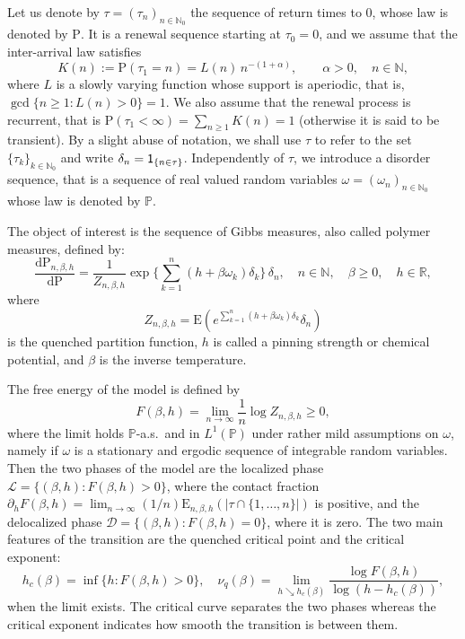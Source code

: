 \documentclass[10pt]{amsart}
\theoremstyle{definition}\newtheorem{defi}[theo]{Definition}\newtheorem{rema}[theo]{Remark}\newtheorem{exam}[theo]{Example}\newtheorem{exem}[theo]{Example}\newtheorem{nota}[theo]{Notation}
\newcommand{\bbN}{{\ensuremath{\mathbb N}}}
\newcommand{\bbP}{{\ensuremath{\mathbb P}}}
\newcommand{\bbR}{{\ensuremath{\mathbb R}}}
\newcommand{\cD}{{\ensuremath{\mathcal D}}}
\newcommand{\cL}{{\ensuremath{\mathcal L}}}
\newcommand{\ga}{\alpha}
\newcommand{\gb}{\beta}
\newcommand{\gd}{\delta}
\newcommand{\go}{\omega}
\newcommand{\dd}{\mathrm{d}}
\newcommand\bP{\ensuremath{\mathrm{P}}}
\newcommand\bE{\ensuremath{\mathrm{E}}}
\newcommand{\ind}{{\sf 1}}
\begin{document}
Let us denote by $\tau = (\tau_n)_{n\in\bbN_0}$ the sequence of return times to $0$, whose law is denoted by $\bP$. It is a renewal sequence starting at $\tau_0 = 0$, and we assume that the inter-arrival law satisfies
\begin{equation}\label{eq:defK_regvar}
K(n) := \bP(\tau_1 = n) = L(n) \, n^{- (1 + \ga)},\qquad \ga > 0,\quad n\in\bbN,
\end{equation}
where $L$ is a slowly varying function whose support is aperiodic, that is, $\gcd\{n \geq 1 \colon L(n) > 0\}= 1$. We also assume that the renewal process is recurrent, that is $\bP(\tau_1 < \infty) = \sum_{n\ge 1} K(n) = 1$ (otherwise it is said to be transient). By a slight abuse of notation, we shall use $\tau$ to refer to the set $\{\tau_k\}_{k\in\bbN_0}$ and write $\gd_n = \ind_{\{n\in\tau\}}$. Independently of $\tau$, we introduce a disorder sequence, that is a sequence of real valued random variables $\go = (\go_n)_{n\in \bbN_0}$ whose law is denoted by $\bbP$.

The object of interest is the sequence of Gibbs measures, also called polymer measures, defined by:
\begin{equation}\label{eq:defquemeas}
\frac{\dd \bP_{n,\gb,h}}{\dd \bP} = \frac{1}{Z_{n,\gb,h}} \exp \bigg\{\sum_{k=1}^n (h + \gb \go_k)\gd_k \bigg\} \,\gd_n, \quad n \in \bbN, \quad \gb \geq 0, \quad h \in \bbR,
\end{equation}
where
\begin{equation}\label{eq:defquepf}
Z_{n,\gb,h} = \bE \left(e^{\sum_{k=1}^n (h + \gb \go_k) \gd_k} \gd_n \right)
\end{equation}
is the quenched partition function, $h$ is called a pinning strength or chemical potential, and $\gb$ is the inverse temperature.

The free energy of the model is defined by
\begin{equation}
F(\gb,h) = \lim_{n \to \infty} \frac{1}{n} \log Z_{n,\gb,h} \geq 0,
\end{equation}
where the limit holds $\bbP$-a.s.~and in $L^1(\bbP)$ under rather mild assumptions on $\go$, namely if $\go$ is a stationary and ergodic sequence of integrable random variables. Then the two phases of the model are the localized phase $\cL = \{(\gb, h): F(\gb, h)>0\}$, where the contact fraction $\partial_h F(\gb,h) = \lim_{n \to \infty} (1/n) \bE_{n,\gb,h}(|\tau \cap \{1,\ldots,n\}|)$ is positive, and the delocalized phase $\cD = \{(\gb, h): F(\gb, h)=0\}$, where it is zero. The two main features of the transition are the quenched critical point and the critical exponent:
\begin{equation}
h_c(\gb) = \inf\{h \colon F(\gb,h) > 0\},\quad \nu_q(\gb) = \lim_{h \searrow h_c(\gb)} \frac{\log F(\gb,h)}{\log (h - h_c(\gb))},
\end{equation}
when the limit exists. The critical curve separates the two phases whereas the critical exponent indicates how smooth the transition is between them.
\end{document}
